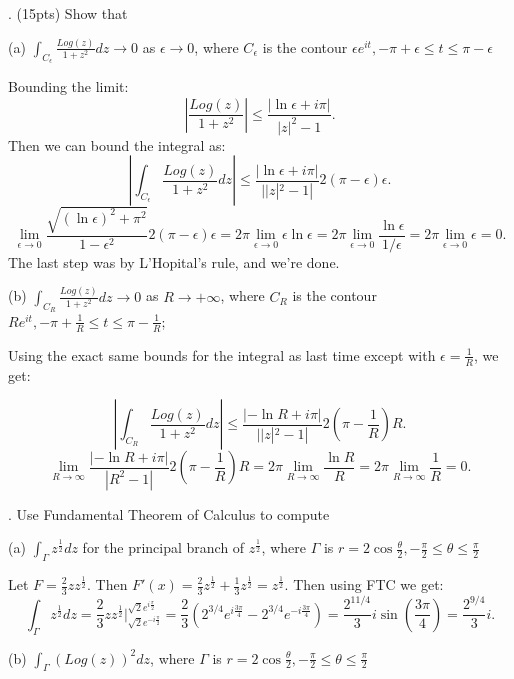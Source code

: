 \documentclass[letterpaper, reqno,11pt]{article}
\begin{document}
\medskip

. (15pts) Show that

(a) $ \int_{C_\epsilon } \frac{ Log (z) }{1+z^2} dz  \to 0 $ as $\epsilon \to 0$, where $ C_\epsilon  $ is the contour $ \epsilon e^{i t}, -\pi + \epsilon  \leq  t \leq  \pi -\epsilon $

Bounding the limit: 
\[
\left|\frac{Log(z)}{1+z^2}\right|\leq \frac{|\ln\epsilon+i\pi|}{|z|^2-1}
.\]
Then we can bound the integral as: 
\[
\left|\int_{C_\epsilon}\frac{Log(z)}{1+z^2}dz\right|\leq \frac{|\ln\epsilon+i\pi|}{||z|^2-1|}2(\pi-\epsilon)\epsilon
.\]
\[
\lim_{\epsilon\to 0}\frac{\sqrt{(\ln\epsilon)^2+\pi^2}}{1-\epsilon^2}2(\pi-\epsilon)\epsilon=2\pi\lim_{\epsilon\to 0}\epsilon \ln\epsilon=2\pi\lim_{\epsilon\to 0}\frac{\ln\epsilon}{1 /\epsilon}=2\pi\lim_{\epsilon\to 0}\epsilon=0
.\]
The last step was by L'Hopital's rule, and we're done. 

(b) $ \int_{C_R } \frac{ Log (z) }{1+z^2} dz  \to 0 $ as $R \to +\infty $, where $ C_R $ is the contour $ R e^{i t}, -\pi + \frac{1}{R}   \leq  t \leq  \pi -\frac{1}{R} $;

Using the exact same bounds for the integral as last time except with $\epsilon=\frac{1}{R}$, we get: 

\[
\left|\int_{C_R}\frac{Log(z)}{1+z^2}dz\right|\leq \frac{|-\ln R+i\pi|}{||z|^2-1|}2(\pi-\frac{1}{R})R
.\]
\[
\lim_{R\to \infty}\frac{|-\ln R+i\pi|}{|R^2-1|}2(\pi-\frac{1}{R})R=2\pi\lim_{R\to \infty}\frac{\ln R}{R}=2\pi\lim_{R\to \infty}\frac{1}{R}=0
.\]


\medskip

. Use Fundamental Theorem of Calculus to compute

(a) $ \int_{ \Gamma} z^{\frac{1}{2}} dz $ for the principal branch  of $ z^{\frac{1}{2}}$, where $ \Gamma $ is $ r= 2 \cos \frac{\theta}{2}, -\frac{\pi}{2} \leq \theta \leq \frac{\pi}{2}$

Let $F=\frac{2}{3}z z^{\frac{1}{2}}$. Then $F'(x)=\frac{2}{3}z^{\frac{1}{2}}+\frac{1}{3}z^{\frac{1}{2}}=z^{\frac{1}{2}}$. Then using FTC we get: 
\[
\int_{\Gamma}z^{\frac{1}{2}}dz=\frac{2}{3}z z^{\frac{1}{2}}\bigg|_{\sqrt{2}e^{-i\frac{\pi}{2}} }^{\sqrt{2}e^{i\frac{\pi}{2}} }=\frac{2}{3}\left( 2^{3 /4}e^{i\frac{3\pi}{4}}-2^{3 /4}e^{-i\frac{3\pi}{4}} \right)=\frac{2^{11 /4}}{3}i\sin(\frac{3\pi}{4})=\frac{2^{9/4}}{3}i
.\]

(b) $ \int_{\Gamma} (Log (z))^2 dz$, where $ \Gamma $ is $ r= 2 \cos \frac{\theta}{2}, -\frac{\pi}{2} \leq \theta \leq \frac{\pi}{2}$
\end{document}
